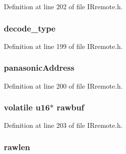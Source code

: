 Definition at line 202 of file I\-Rremote.\-h.

\hypertarget{structdecode__results_ac4756bd87be2b8e185354584b24cff5e}{
\subsubsection[{decode\-\_\-type}]{ decode\-\_\-type}}\label{structdecode__results_ac4756bd87be2b8e185354584b24cff5e}


Definition at line 199 of file I\-Rremote.\-h.

\hypertarget{structdecode__results_a7d11bce20bd4dd8aa547a7400137404e}{
\subsubsection[{panasonic\-Address}]{ panasonic\-Address}}\label{structdecode__results_a7d11bce20bd4dd8aa547a7400137404e}


Definition at line 200 of file I\-Rremote.\-h.

\hypertarget{structdecode__results_a07b0ebd92141cf1bdd9178daab29c040}{
\subsubsection[{rawbuf}]{\setlength{\rightskip}{0pt plus 5cm}volatile {\bf u16}$\ast$ rawbuf}}\label{structdecode__results_a07b0ebd92141cf1bdd9178daab29c040}


Definition at line 203 of file I\-Rremote.\-h.

\hypertarget{structdecode__results_ad02b5d14a59e79e0a330e030a7cfdaf1}{
\subsubsection[{rawlen}]{ rawlen}}\label{structdecode__results_ad02b5d14a59e79e0a330e030a7cfdaf1}


